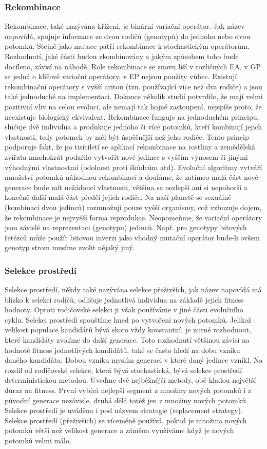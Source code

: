 \subsubsection{Rekombinace}
Rekombinace, také nazývána křížení, je binární variační operátor. Jak název napovídá, spojuje informace ze dvou rodičů (genotypů) do jednoho nebo dvou potomků. Stejně jako mutace patří rekombinace k stochastickým operátorům. Rozhodnutí, jaké části budou zkombinovány a jakým způsobem toho bude docíleno, závisí na náhodě. Role rekombinace se znovu liší v rozličných EA, v GP se jedná o klíčové variační operátory, v EP nejsou použity vůbec. Existují rekombinační operátory s vyšší aritou (tzn. používající více než dva rodiče) a jsou také jednoduché na implementaci. Dokonce několik studií potvrdilo, že mají velmi pozitivní vliv na celou evoluci, ale nemají tak hojné zastoupení, nejspíše proto, že neexistuje biologický ekvivalent. Rekombinace funguje na jednoduchém principu, slučuje dvě individua a produkuje jednoho či více potomků, kteří kombinují jejich vlastnosti, tedy potomek by měl být úspěšnější než jeho rodiče. Tento princip podporuje fakt, že po tisíciletí se aplikací rekombinace na rostliny a zemědělská zvířata mnohokrát podařilo vytvořit nové jedince s vyšším výnosem či jinými výhodnými vlastnostmi (odolnost proti škůdcům atd). Evoluční algoritmy vytváří množství potomků náhodnou rekombinací a doufáme, že zatímco malá část nové generace bude mít nežádoucí vlastnosti, většina se nezlepší ani si nepohorší a konečně další malá část předčí jejich rodiče. Na naší planetě se sexuálně (kombinací dvou jedinců) rozmnožují pouze vyšší organismy, což vzbuzuje dojem, že rekombinace je nejvyšší forma reprodukce. Neopomeňme, že  variační operátory jsou závislé na reprezentaci (genotypu) jedinců. Např. pro genotypy bitových řetězců může použít bitovou inverzi jako vhodný mutační operátor bude-li ovšem genotyp strom musíme zvolit nějaký jiný. 
\subsubsection{Selekce prostředí}
Selekce prostředí, někdy také nazývána selekce přeživších, jak název napovídá má blízko k selekci rodičů, odlišuje jednotlivá individua na základě jejich fitness hodnoty. Oproti rodičovské selekci ji však používáme v jiné části evolučního cyklu. Selekci prostředí spouštíme hned po vytvoření nových potomků. Jelikož velikost populace kandidátů bývá skoro vždy konstantní, je nutné rozhodnout, které kandidáty zvolíme do další generace. Toto rozhodnutí většinou závisí na hodnotě fitness jednotlivých kandidátů, také se často hledí na dobu vzniku daného kandidáta. Dobou vzniku myslím generaci v které daný jedinec vznikl. Na rozdíl od rodičovské selekce, která bývá stochastická, bývá selekce prostředí deterministickou metodou. Uveďme dvě nejběžnější metody, obě kladou největší důraz na fitness. První vybírá nejlepší segment z množiny nových potomků i z původní generace nezávisle, druhá dělá totéž jen z množiny nových potomků. Selekce prostředí je uváděna i pod názvem  strategie (replacement strategy). Selekce prostředí (přeživších) se víceméně používá, pokud je množina nových potomků větší než velikost generace a záměna využíváme když je nových potomků velmi málo.
